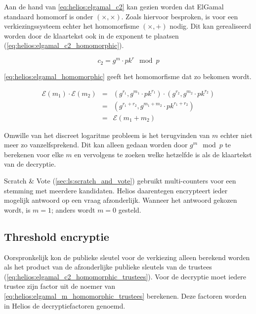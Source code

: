 \npar Aan de hand van \ref{eq:helios:elgamal_c2} kan gezien worden dat ElGamal standaard homomorf is onder $(\times, \times)$. Zoals hiervoor besproken, is voor een verkiezingssysteem echter het homomorfisme $(\times, +)$ nodig. Dit kan gerealiseerd worden door de klaartekst ook in de exponent te plaatsen (\ref{eq:helios:elgamal_c2_homomorphic}).

\begin{equation}
  \label{eq:helios:elgamal_c2_homomorphic}
  c_2 = g^m \cdot {pk}^r \mod{p}
\end{equation}

\ref{eq:helios:elgamal_homomorphic} geeft het homomorfisme dat zo bekomen wordt.

\begin{equation}
  \label{eq:helios:elgamal_homomorphic}
  \begin{array}{lcl}
    \mathcal{E}(m_1) \cdot \mathcal{E}(m_2) &=& (g^{r_1}, g^{m_1} \cdot {pk}^{r_1}) \cdot (g^{r_2}, g^{m_2} \cdot {pk}^{r_2}) \\
      &=& (g^{r_1 + r_2}, g^{m_1 + m_2} \cdot {pk}^{r_1 + r_2}) \\
      &=& \mathcal{E}(m_1 + m_2)
  \end{array}
\end{equation}

\npar Omwille van het discreet logaritme probleem is het terugvinden van $m$ echter niet meer zo vanzelfsprekend.\cite{menezes_vanstone_oorschot_handbook_of_applied_cryptography} Dit kan alleen gedaan worden door $g^m \mod{p}$ te berekenen voor elke $m$ en vervolgens te zoeken welke hetzelfde is als de klaartekst van de decryptie.

\npar Scratch \& Vote (\ref{sec:ls:scratch_and_vote}) gebruikt multi-counters voor een stemming met meerdere kandidaten. Helios daarentegen encrypteert ieder mogelijk antwoord op een vraag afzonderlijk. Wanneer het antwoord gekozen wordt, is $m = 1$; anders wordt $m = 0$ gesteld.

\subsection{Threshold encryptie}
\label{sec:helios:threshold_encryptie}

Oorspronkelijk kon de publieke sleutel voor de verkiezing alleen berekend worden als het product van de afzonderlijke publieke sleutels van de trustees (\ref{eq:helios:elgamal_c2_homomorphic_trustees}). Voor de decryptie moet iedere trustee zijn factor uit de noemer van \ref{eq:helios:elgamal_m_homomorphic_trustees} berekenen. Deze factoren worden in Helios de decryptiefactoren genoemd.

